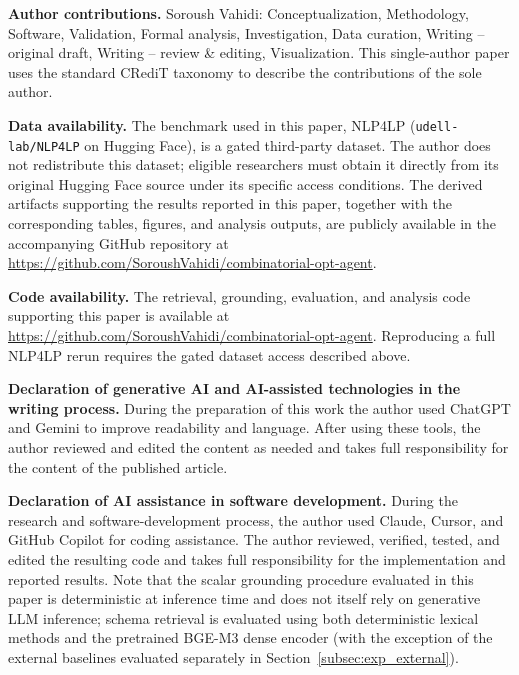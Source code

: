 \documentclass[pdflatex,sn-basic,Numbered]{sn-jnl}
\begin{document}
\noindent\textbf{Author contributions.} Soroush Vahidi: Conceptualization, Methodology, Software, Validation, Formal analysis, Investigation, Data curation, Writing -- original draft, Writing -- review \& editing, Visualization. This single-author paper uses the standard CRediT taxonomy to describe the contributions of the sole author.

\noindent\textbf{Data availability.} The benchmark used in this paper, NLP4LP (\texttt{udell-lab/NLP4LP} on Hugging Face), is a gated third-party dataset. The author does not redistribute this dataset; eligible researchers must obtain it directly from its original Hugging Face source under its specific access conditions. The derived artifacts supporting the results reported in this paper, together with the corresponding tables, figures, and analysis outputs, are publicly available in the accompanying GitHub repository at \url{https://github.com/SoroushVahidi/combinatorial-opt-agent}.

\noindent\textbf{Code availability.} The retrieval, grounding, evaluation, and analysis code supporting this paper is available at \url{https://github.com/SoroushVahidi/combinatorial-opt-agent}. Reproducing a full NLP4LP rerun requires the gated dataset access described above.

\noindent\textbf{Declaration of generative AI and AI-assisted technologies in the writing process.} During the preparation of this work the author used ChatGPT and Gemini to improve readability and language. After using these tools, the author reviewed and edited the content as needed and takes full responsibility for the content of the published article.

\noindent\textbf{Declaration of AI assistance in software development.} During the research and software-development process, the author used Claude, Cursor, and GitHub Copilot for coding assistance. The author reviewed, verified, tested, and edited the resulting code and takes full responsibility for the implementation and reported results. Note that the scalar grounding procedure evaluated in this paper is deterministic at inference time and does not itself rely on generative LLM inference; schema retrieval is evaluated using both deterministic lexical methods and the pretrained BGE-M3 dense encoder (with the exception of the external baselines evaluated separately in Section~\ref{subsec:exp_external}).


\end{document}
